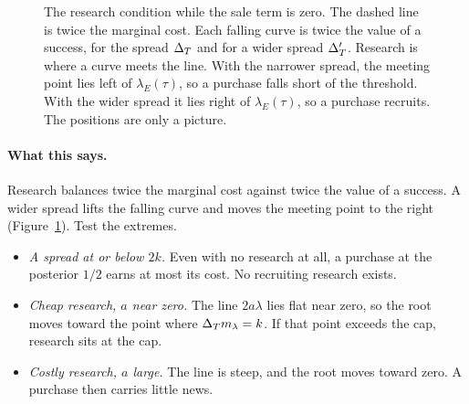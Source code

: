 \begin{figure}[ht]
\centering
{}
\caption{The research condition while the sale term is zero. The dashed line is twice the marginal cost. Each falling
curve is twice the value of a success, for the spread \(\Delta_T\) and for a wider spread \(\Delta_T'\). Research is where a
curve meets the line. With the narrower spread, the meeting point lies left of \(\lambda_E(\tau)\), so a purchase
falls short of the threshold. With the wider spread it lies right of \(\lambda_E(\tau)\), so a purchase recruits. The
positions are only a picture.}
\label{fig:research-condition}
\end{figure}

\paragraph{What this says.} Research balances twice the marginal cost against twice the value of a success. A wider
spread lifts the falling curve and moves the meeting point to the right (Figure~\ref{fig:research-condition}). Test
the extremes.
\begin{itemize}
\item \emph{A spread at or below \(2k\).} Even with no research at all, a purchase at the posterior \(1/2\) earns at
most its cost. No recruiting research exists.
\item \emph{Cheap research, \(a\) near zero.} The line \(2a\lambda\) lies flat near zero, so the root moves toward the
point where \(\Delta_T m_\lambda=k\). If that point exceeds the cap, research sits at the cap.
\item \emph{Costly research, \(a\) large.} The line is steep, and the root moves toward zero. A purchase then carries
little news.
\end{itemize}

